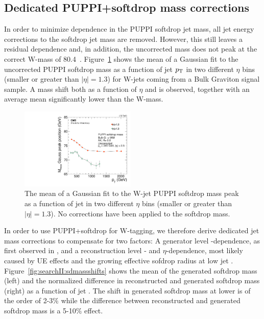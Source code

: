 \subsection{Dedicated PUPPI+softdrop mass corrections}

In order to minimize \PT dependence in the PUPPI softdrop jet mass, all jet energy corrections to the softdrop jet mass are removed. However, this still leaves a residual \PT dependence and, in addition, the uncorrected mass does not peak at the correct W-mass of 80.4~\GeV. Figure~\ref{fig:searchII:UncorrSD} shows the mean of a Gaussian fit to the uncorrected PUPPI softdrop mass as a function of jet $p_{\mathrm{T}}$ in two different $\eta$ bins (smaller or greater than $|\eta|=1.3$) for W-jets coming from a Bulk Graviton signal sample. A mass shift both as a function of $\eta$ and \PT is observed, together with an average mean significantly lower than the W-mass.

\begin{figure}[htbp]
\centering
\includegraphics[width=0.49\textwidth]{figures/analysis/search2/AN-16-235/plots/RecoPuppiSoftdropMass_vspt.pdf}
\caption{The mean of a Gaussian fit to the W-jet PUPPI softdrop mass peak as a function of jet \PT in two different $\eta$ bins (smaller or greater than $|\eta|=1.3$). No corrections have been applied to the softdrop mass.}
\label{fig:searchII:UncorrSD}
\end{figure}

In order to use PUPPI+softdrop for W-tagging, we therefore derive dedicated jet mass corrections to compensate for two factors: A generator level \PT-dependence, as first observed in \label{sec:searchI:wtagging}, and a reconstruction level \PT- and $\eta$-dependence, most likely caused by UE effects and the growing effective sofdrop radius at low jet \PT. Figure~\ref{fig:searchII:sdmassshifts} shows the mean of the generated softdrop mass (left) and the normalized difference in reconstructed and generated softdrop mass (right) as a function of jet \PT. The shift in generated softdrop mass at lower \PT is of the order of 2-3$\%$ while the difference between reconstructed and generated softdrop mass is a 5-10$\%$ effect.

